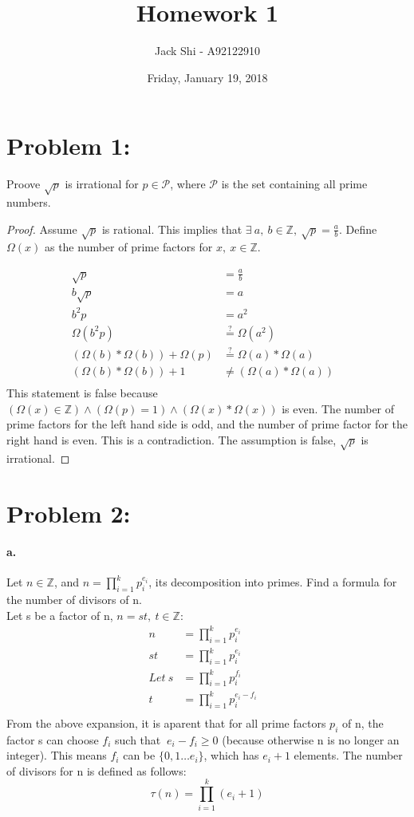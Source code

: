 \documentclass{article}
\title{Homework 1}
\author{Jack Shi - A92122910}
\date{Friday, January 19, 2018}
\begin{document}
\maketitle

\section*{Problem 1: }
	Proove $\sqrt{p}$ is irrational for $p \in \mathcal{P}$, where 
	$\mathcal{P}$ is the set containing all prime numbers.
	\begin{proof}
	Assume $\sqrt{p}$ is rational. This implies
	that $\exists\ a,\ b \in \mathbb{Z},\ \sqrt{p} = \frac{a}{b}$. Define 
	$\Omega(x)$ as the number of prime factors for $x,\ x\in\mathbb{Z}$.

	\begin{align*}
		\sqrt{p} &= \frac{a}{b}& \\
		b\sqrt{p} &= a& \\
		b^2p &= a^2& \\
		\Omega(b^2p) &\stackrel{?}{=} \Omega(a^2)& \\
		(\Omega(b)*\Omega(b)) + \Omega(p) &\stackrel{?}{=} \Omega(a)*\Omega(a)& \\
		(\Omega(b)*\Omega(b)) + 1 &\neq (\Omega(a)*\Omega(a))& \\
	\end{align*}
	This statement is false because $(\Omega(x)\in\mathbb{Z}) \wedge (\Omega(p)=1)
	\wedge (\Omega(x) * \Omega(x))$ is even. The number of prime factors for the 
	left hand side is odd, and the number of prime factor for the right hand is 
	even. This is a contradiction. The assumption is false, $\sqrt{p}$ is
	irrational.
	\end{proof}

\section*{Problem 2: }
	\paragraph{a. }Let $n\in\mathbb{Z}$, and $n=\prod_{i=1}^{k}p_i^{e_i}$, its
	decomposition into primes. Find a formula for the number of divisors of n.\\
	Let s be a factor of n, $n=st,\ t\in\mathbb{Z}$:
	\begin{align*}
				 n &= \prod_{i=1}^{k}p_i^{e_i}& \\
				st &= \prod_{i=1}^{k}p_i^{e_i}& \\
		Let\ s &= \prod_{i=1}^{k}p_i^{f_i}& \\
				 t &= \prod_{i=1}^{k}p_i^{e_i-f_i}& \\
	\end{align*}
	From the above expansion, it is aparent that for all prime factors $p_i$ of n, 
	the factor s can choose $f_i$ such that $\ e_i-f_i \ge 0$ (because otherwise n
	is no longer an integer). This means $f_i$ can be $\{0, 1 \ldots e_i\}$, which
	has $e_i+1$ elements.
	The number of divisors for n is defined as follows:
	$$\tau(n)=\prod_{i=1}^{k}(e_i+1)$$
\end{document}
